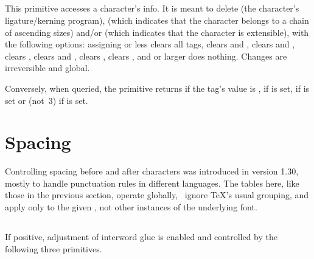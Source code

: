 \documentclass{pdftexmanual}
\begin{document}
\subsection{}

This primitive accesses a character's  info. It is meant
to delete  (the character's ligature/kerning program),
 (which indicates that the character belongs to a chain of
ascending sizes) and/or  (which indicates that the character
is extensible), with the following options: assigning  or less
clears all tags,  clears  and ,
 clears  and ,  clears
,  clears  and ,
 clears ,  clears ,
and  or larger does nothing. Changes are irreversible and global.

Conversely, when queried, the primitive returns  if the tag's
value is ,  if  is set,  if
 is set or  (not~3) if  is set.

\section{Spacing}

Controlling spacing before and after characters was introduced in
version 1.30, mostly to handle punctuation rules in different
languages. The  tables here, like those in the previous
section, operate globally, \ie\ ignore \TeX's usual grouping, and apply
only to the given , not other instances of the
underlying font.

\subsection{}

If positive, adjustment of interword glue is enabled and controlled by the
following three primitives.

\subsection{}
\end{document}

